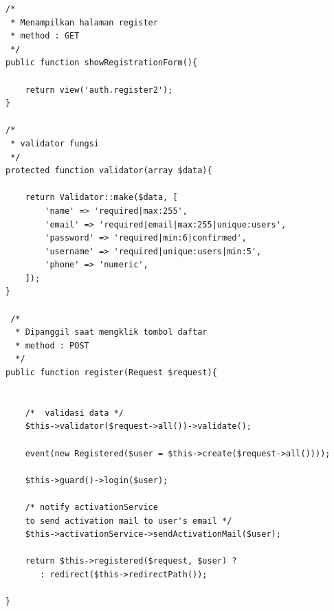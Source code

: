 \begin{lstlisting}[label=cdbe.01-01,style=php,caption=Kode Sumber Antarmuka Registrasi]
/* 
 * Menampilkan halaman register
 * method : GET 
 */
public function showRegistrationForm(){
	
	return view('auth.register2');
}

/*
 * validator fungsi 
 */
protected function validator(array $data){
	
	return Validator::make($data, [
		'name' => 'required|max:255',
		'email' => 'required|email|max:255|unique:users',
		'password' => 'required|min:6|confirmed',
		'username' => 'required|unique:users|min:5',
		'phone' => 'numeric',
	]);
}

 /*	
  * Dipanggil saat mengklik tombol daftar
  * method : POST 
  */
public function register(Request $request){

				
	/*	validasi data */
	$this->validator($request->all())->validate();

	event(new Registered($user = $this->create($request->all())));

	$this->guard()->login($user);

	/* notify activationService 
	to send activation mail to user's email */
	$this->activationService->sendActivationMail($user);

	return $this->registered($request, $user) ?
	   : redirect($this->redirectPath());
	 
}
	  
	  
\end{lstlisting}
	  
      
      
